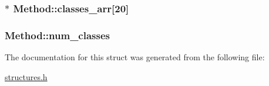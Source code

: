 \subsubsection[{\texorpdfstring{classes\+\_\+arr}{classes_arr}}]{$\ast$ Method\+::classes\+\_\+arr\mbox{[}20\mbox{]}}\hypertarget{structMethod_ace741cd234df7db5849ee2af75870b8c}{}\label{structMethod_ace741cd234df7db5849ee2af75870b8c}
\subsubsection[{\texorpdfstring{num\+\_\+classes}{num_classes}}]{ Method\+::num\+\_\+classes}\hypertarget{structMethod_a40dccf4ca5a8d3a74798917a888be720}{}\label{structMethod_a40dccf4ca5a8d3a74798917a888be720}


The documentation for this struct was generated from the following file\+:\begin{DoxyCompactItemize}
\item 
\hyperlink{structures_8h}{structures.\+h}\end{DoxyCompactItemize}
